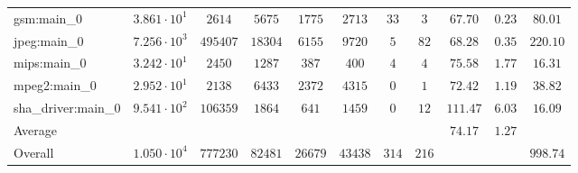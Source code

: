 \begin{tabular}{|l|c|c|c|c|c|c|c|c|c|c|}
gsm:main\_0             & $ 3.861 \cdot 10^{1} $ & $ 2614   $ & $ 5675  $ & $ 1775  $ & $ 2713  $ & $ 33  $ & $ 3   $ & $ 67.70       $ & $ 0.23    $ & $ 80.01   $ \\
jpeg:main\_0            & $ 7.256 \cdot 10^{3} $ & $ 495407 $ & $ 18304 $ & $ 6155  $ & $ 9720  $ & $ 5   $ & $ 82  $ & $ 68.28       $ & $ 0.35    $ & $ 220.10  $ \\
mips:main\_0            & $ 3.242 \cdot 10^{1} $ & $ 2450   $ & $ 1287  $ & $ 387   $ & $ 400   $ & $ 4   $ & $ 4   $ & $ 75.58       $ & $ 1.77    $ & $ 16.31   $ \\
mpeg2:main\_0           & $ 2.952 \cdot 10^{1} $ & $ 2138   $ & $ 6433  $ & $ 2372  $ & $ 4315  $ & $ 0   $ & $ 1   $ & $ 72.42       $ & $ 1.19    $ & $ 38.82   $ \\
sha\_driver:main\_0     & $ 9.541 \cdot 10^{2} $ & $ 106359 $ & $ 1864  $ & $ 641   $ & $ 1459  $ & $ 0   $ & $ 12  $ & $ 111.47      $ & $ 6.03    $ & $ 16.09   $ \\
\hline
Average                 & $                    $ & $        $ & $       $ & $       $ & $       $ & $     $ & $     $ & $ 74.17       $ & $ 1.27    $ & $         $ \\
\hline
Overall                 & $ 1.050 \cdot 10^{4} $ & $ 777230 $ & $ 82481 $ & $ 26679 $ & $ 43438 $ & $ 314 $ & $ 216 $ & $             $ & $         $ & $ 998.74  $ \\
\hline
\end{tabular}
